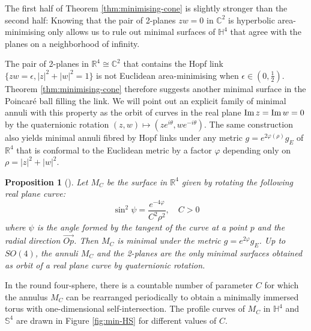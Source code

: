 \documentclass[11pt]{article}
\newtheorem{proposition}[theorem]{Proposition}
\newcommand{\im}{\mathop{\rm Im}\nolimits}
\begin{document}
The first half of Theorem \ref{thm:minimising-cone} is slightly stronger than the second
half: Knowing that the pair of 2-planes \(zw =
0\) in \(\mathbb{C}^2\) is hyperbolic area-minimising only allows us to rule out minimal surfaces of \(\mathbb{H}^4\) 
that agree with the planes on a neighborhood of infinity.

The pair of 2-planes in \(\mathbb{R}^4\cong
\mathbb{C}^2\) that contains the Hopf link \(\{zw=\epsilon, |z|^2 + |w|^2 = 1\}\) is
not Euclidean area-minimising when \(\epsilon\in(0, \frac{1}{2})\). Theorem
\ref{thm:minimising-cone} therefore suggests another minimal
surface in the Poincaré ball filling the link. 
We will point out an explicit family of minimal annuli with this
property as the orbit of curves in the real plane \(\im z = \im w = 0\) by the quaternionic rotation \((z,w)\mapsto (ze^{i\theta},
w e^{-i\theta})\). 
The same construction also yields minimal annuli fibred by Hopf links under any metric  \(g =
e^{2\varphi(\rho)}g_E\) of \(\mathbb{R}^4\) that is conformal to the Euclidean metric by a factor \(\varphi\) depending only on \(\rho = |z|^2 +|w|^2\).

\begin{proposition}[]
\label{prop:min-annuli}
Let \(M_{C}\) be the surface in \(\mathbb{R}^4\) given by rotating the following real plane curve:
\begin{equation}
\label{eq:min-annuli}
\sin^2\psi = \frac{e^{-4\varphi}}{C^2\rho^2}, \quad C > 0
\end{equation}
where \(\psi\) is the angle formed by the tangent of the curve at a point \(p\) and the
radial direction \(\overrightarrow{Op}\). Then \(M_{C}\) is
minimal under the metric \(g =
e^{2\varphi}g_E\). Up to \(SO(4)\), the annuli \(M_{C}\) and the 2-planes are the only
minimal surfaces obtained as orbit of a real plane curve by quaternionic rotation.
\end{proposition}

In the round four-sphere, there is a countable number of parameter \(C\) for which the annulus \(M_C\) can be rearranged periodically to
obtain a minimally immersed torus with one-dimensional self-intersection.
The profile curves of \(M_C\) in \(\mathbb{H}^4\) and
\(\mathbb{S}^4\) are drawn in Figure \ref{fig:min-HS} for different values of \(C\). 
\end{document}
